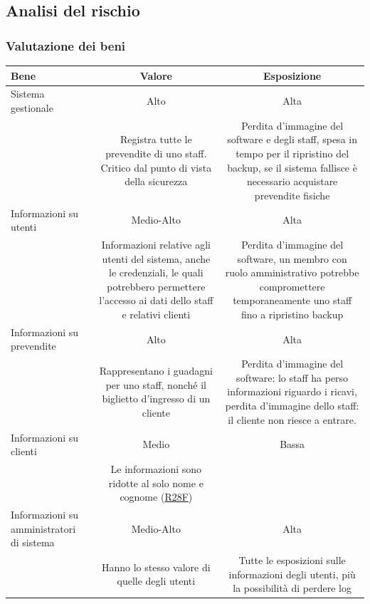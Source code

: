 \documentclass[a4paper]{article}
\begin{document}
\newpage

\subsection{Analisi del rischio}

\subsubsection{Valutazione dei beni}

\begin{center}
    \begin{tabulary}{1\textwidth}{L|C|C}
         \textbf{Bene} & \textbf{Valore} & \textbf{Esposizione}  \\
         \hline
         \hline
         Sistema gestionale & Alto & Alta \\
                            & Registra tutte le prevendite di uno staff. Critico dal punto di vista della sicurezza & Perdita d'immagine del software e degli staff, spesa in tempo per il ripristino del backup, se il sistema fallisce è necessario acquistare prevendite fisiche \\
         \hline
         Informazioni su utenti & Medio-Alto & Alta\\
                            & Informazioni relative agli utenti del sistema, anche le credenziali, le quali potrebbero permettere l'accesso ai dati dello staff e relativi clienti & Perdita d'immagine del software, un membro con ruolo amministrativo potrebbe compromettere temporaneamente uno staff fino a ripristino backup\\
         \hline
         Informazioni su prevendite & Alto & Alta \\
                                    & Rappresentano i guadagni per uno staff, nonché il biglietto d'ingresso di un cliente & Perdita d'immagine del software: lo staff ha perso informazioni riguardo i ricavi, perdita d'immagine dello staff: il cliente non riesce a entrare.\\
         \hline
         Informazioni su clienti & Medio & Bassa \\
                                  & Le informazioni sono ridotte al solo nome e cognome (\hyperlink{R28F}{R28F}) & \\
         \hline
         Informazioni su amministratori di sistema & Medio-Alto &  Alta \\
                                                    & Hanno lo stesso valore di quelle degli utenti & Tutte le esposizioni sulle informazioni degli utenti, più la possibilità di perdere log\\ 
         \hline
    \end{tabulary}
\end{center}
\end{document}
